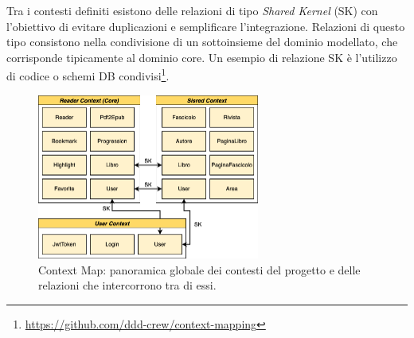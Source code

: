 Tra i contesti definiti esistono delle relazioni di tipo \textit{Shared Kernel}\cite{evans_domain-driven_2004} (SK) con l'obiettivo di evitare duplicazioni e semplificare l'integrazione. Relazioni di questo tipo consistono nella condivisione di un sottoinsieme del dominio modellato, che corrisponde tipicamente al dominio core. Un esempio di relazione SK è l'utilizzo di codice o schemi DB condivisi\footnote{\url{https://github.com/ddd-crew/context-mapping}}.\\

\begin{figure}[H]
\centering
\includegraphics[width=0.65\textwidth]{img/tesi-20-app-domain.drawio.png}
\caption{Context Map: panoramica globale dei contesti del progetto e delle relazioni che intercorrono tra di essi.}
\end{figure}

